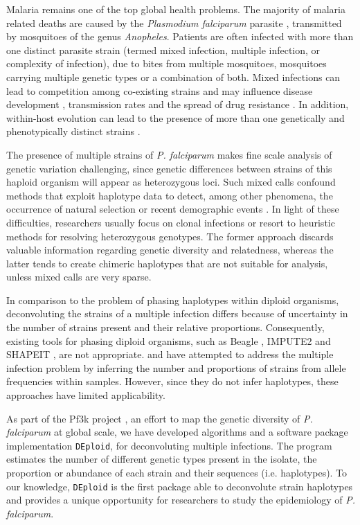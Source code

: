 \documentclass{nature}
\begin{document}
\noindent Malaria remains one of the top global health problems. The majority of malaria related deaths are caused by the {\it Plasmodium falciparum} parasite \cite{WHO2016}, transmitted by mosquitoes of the genus {\it Anopheles}. Patients are often infected with more than one distinct parasite strain (termed mixed infection, multiple infection, or complexity of infection), due to bites from multiple mosquitoes, mosquitoes carrying multiple genetic types or a combination of both. Mixed infections  can lead to competition among co-existing strains and may influence disease development \cite{deRoode2005}, transmission rates \cite{Arnot1998} and the spread of drug resistance \cite{deRoode2004}. In addition, within-host evolution can lead to the presence of more than one genetically and phenotypically distinct strains \cite{Bell2006}.

The presence of multiple strains of {\it P. falciparum} makes fine scale analysis of genetic variation challenging, since genetic differences between strains of this haploid organism will appear as heterozygous loci. Such mixed calls confound methods that exploit haplotype data to detect, among other phenomena, the occurrence of natural selection or recent demographic events \cite{Harris2013, Lawson2012, Mathieson2014, Sabeti2002}. In light of these difficulties, researchers usually focus on clonal infections or resort to heuristic methods for resolving heterozygous genotypes. The former approach discards valuable information regarding genetic diversity and relatedness, whereas the latter tends to create chimeric haplotypes that are not suitable for analysis, unless mixed calls are very sparse.

In comparison to the problem of phasing haplotypes within diploid organisms, deconvoluting the strains of a multiple infection differs because of uncertainty in the number of strains present and their relative proportions.  Consequently, existing tools for phasing diploid organisms, such as Beagle \cite{Browning2007}, IMPUTE2 \cite{Howie2009} and SHAPEIT \cite{Delaneau2012, Oconnell2014}, are not appropriate. \cite{Galinsky2015} and \cite{Jack2016} have attempted to address the multiple infection problem by inferring the number and proportions of strains from allele frequencies within samples.  However, since they do not infer haplotypes, these approaches have limited applicability.

As part of the Pf3k project \cite{Pf3k2016}, an effort to map the genetic diversity of {\it P. falciparum} at global scale, we have developed algorithms and a software package implementation \texttt{DEploid}, for deconvoluting multiple infections. The program estimates the number of different genetic types present in the isolate, the proportion or abundance of each strain and their sequences (i.e. haplotypes). To our knowledge, \texttt{DEploid} is the first package able to deconvolute strain haplotypes and provides a unique opportunity for researchers to study the epidemiology of {\it P. falciparum}.
\end{document}
